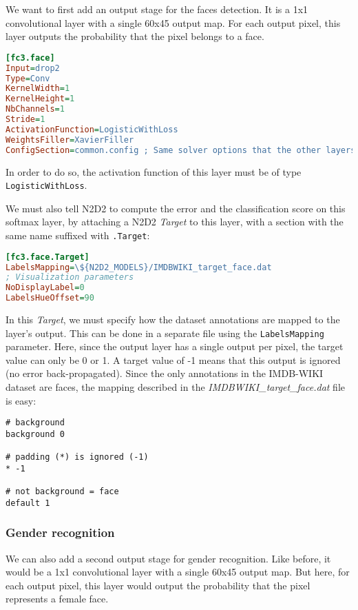 \documentclass[a4paper,11pt,oneside]{article}
\begin{document}
We want to first add an output stage for the faces detection. It is a 1x1
convolutional layer with a single 60x45 output map. For each output pixel, this
layer outputs the probability that the pixel belongs to a face.

\begin{lstlisting}[language=ini]
[fc3.face]
Input=drop2
Type=Conv
KernelWidth=1
KernelHeight=1
NbChannels=1
Stride=1
ActivationFunction=LogisticWithLoss
WeightsFiller=XavierFiller
ConfigSection=common.config ; Same solver options that the other layers
\end{lstlisting}

In order to do so, the activation function of this layer must be of type
\lstinline!LogisticWithLoss!.

We must also tell N2D2 to compute the error and the classification score on this
softmax layer, by attaching a N2D2 \emph{Target} to this layer, with a
section with the same name suffixed with \lstinline!.Target!:

\begin{lstlisting}[language=ini]
[fc3.face.Target]
LabelsMapping=\${N2D2_MODELS}/IMDBWIKI_target_face.dat
; Visualization parameters
NoDisplayLabel=0
LabelsHueOffset=90
\end{lstlisting}

In this \emph{Target}, we must specify how the dataset annotations are mapped to
the layer's output. This can be done in a separate file using the
\lstinline!LabelsMapping! parameter. Here, since the output layer has a single
output per pixel, the target value can only be 0 or 1. A target value of -1
means that this output is ignored (no error back-propagated). Since the only
annotations in the IMDB-WIKI dataset are faces, the mapping described in the
\emph{IMDBWIKI\_target\_face.dat} file is easy:

\begin{lstlisting}
# background
background 0

# padding (*) is ignored (-1)
* -1

# not background = face
default 1
\end{lstlisting}

\subsubsection{Gender recognition}

We can also add a second output stage for gender recognition. Like before, it
would be a 1x1 convolutional layer with a single 60x45 output map. But here, for
each output pixel, this layer would output the probability that the pixel
represents a female face.
\end{document}
